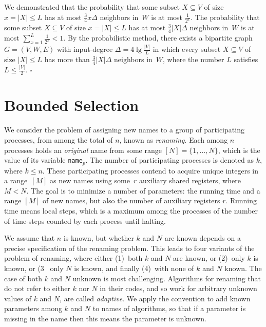 \documentclass[11pt]{article}
\newcommand{\qed}{\hfill $\square$ \smallbreak}
\newenvironment{proof}{\noindent{\bf Proof:}}{\qed}
\begin{document}
\begin{proof}
We demonstrated that the probability that some subset $X \subseteq V$ of size $x=|X|\le L$ has at most $\frac{3}{4}x\Delta$ neighbors in~$W$ is at most $\frac{1}{2^x}$.
The probability that some  subset $X\subseteq V$ of size $x=|X|\le L$ has at most $\frac{3}{4}|X|\Delta$ neighbors in~$W$ is at most $\sum_{x=1}^{L} \frac{1}{2^x} < 1$.
By the probabilistic method, there exists a bipartite graph $G=(V,W,E)$ with input-degree $\Delta=4\lg\frac{|V|}{L}$ in which every subset $X\subseteq V$ of size $|X|\le L$ has more than $\frac{3}{4}|X|\Delta$ neighbors in~$W$, where the number $L$ satisfies $L\le \frac{|V|}{2}$.
\end{proof} 






\section{Bounded Selection}


We consider the problem of assigning new names to a group of participating processes, from among the total of $n$, known as \emph{renaming}.
Each among $n$ processes holds an \emph{original} name from some range $[N]=\{1,\ldots,N\}$, which is the value of its variable \texttt{name}$_p$.
The number of participating processes is denoted as $k$, where $k\le n$.
These participating processes contend to acquire unique integers in a range~$[M]$  as new names using some~$r$ auxiliary shared registers, where $M<N$. 
The goal is to minimize a number of parameters: the running time and a range $[M]$ of new names, but also the number of auxiliary registers $r$.
Running time means local steps, which is a maximum among the processes of the number of time-steps counted by each process until halting. 

We assume that $n$ is known, but whether $k$ and $N$ are known depends on a precise specification of the renaming problem.
This leads to four variants of the problem of renaming, where either (1)~both $k$ and $N$ are known, or (2)~only $k$ is known, or (3~ only $N$ is known, and finally (4)~with none of $k$ and $N$ known.
The case of both $k$ and $N$ unknown is most challenging.
Algorithms for renaming that do not refer to either $k$ nor $N$ in their codes, and so work for arbitrary unknown values of $k$ and $N$, are called \emph{adaptive}.
We apply the convention to add known parameters among $k$ and $N$ to names of algorithms, so that if a parameter  is missing in the name then this means the parameter is unknown.
\end{document}
